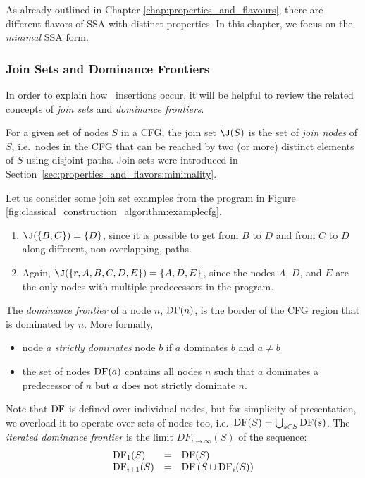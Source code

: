As already outlined in Chapter \ref{chap:properties_and_flavours},
there are different flavors of SSA with distinct properties.
In this chapter, we focus on the \textit{minimal} SSA form.

\subsubsection*{Join Sets and Dominance Frontiers}

In order to explain how \phiop\ insertions occur,
it will be helpful 
to review the related concepts of \textit{join sets} and
\textit{dominance frontiers}.

For a given set of nodes $S$ in a CFG, the join set $\join(S)$
is the set of \textit{join nodes} of $S$,
i.e.\ nodes in the CFG that can be reached by
two (or more) distinct elements of $S$ using disjoint paths.
Join sets were introduced in
Section~\ref{sec:properties_and_flavors:minimality}.

Let us consider some join set examples from the
program in Figure \ref{fig:classical_construction_algorithm:examplecfg}.
\begin{enumerate}
\item $\join(\{B,C\}) = \{D\}$, since it is possible to get from $B$ to $D$
and from $C$ to $D$ along different, non-overlapping, paths.
\item Again, $\join(\{r, A, B, C, D, E \}) = \{A,D,E\}$, since the nodes
$A$, $D$, and $E$ are the only nodes with multiple predecessors in
the program.
\end{enumerate}


The \textit{dominance frontier} of a node $n$,
$\mathrm{DF}(n)$, is the border of the CFG region that is dominated by $n$.
More formally,
\begin{itemize}
\item node $a$ \textit{strictly dominates} node $b$ if $a$ dominates
  $b$ and $a \neq b$
\item the set of nodes $\mathrm{DF}(a)$ contains all nodes $n$ such that $a$
  dominates a predecessor of $n$ but $a$ does not strictly dominate $n$.
\end{itemize}

Note that $\mathrm{DF}$ is defined over individual nodes, 
but for simplicity of presentation, we overload it to 
operate over sets of nodes too, i.e.\ 
$\mathrm{DF}(S) = \bigcup_{s\in S} \mathrm{DF}(s)$.
The \textit{iterated dominance frontier}
is the limit $DF_{i\rightarrow\infty}(S)$
of the sequence:
$$\begin{array}{lll}
\mathrm{DF}_1(S) & = & \mathrm{DF}(S)\\
\mathrm{DF}_{i+1}(S) & = & \mathrm{DF}\left(S\cup \mathrm{DF}_i(S)\right)
\end{array}$$


